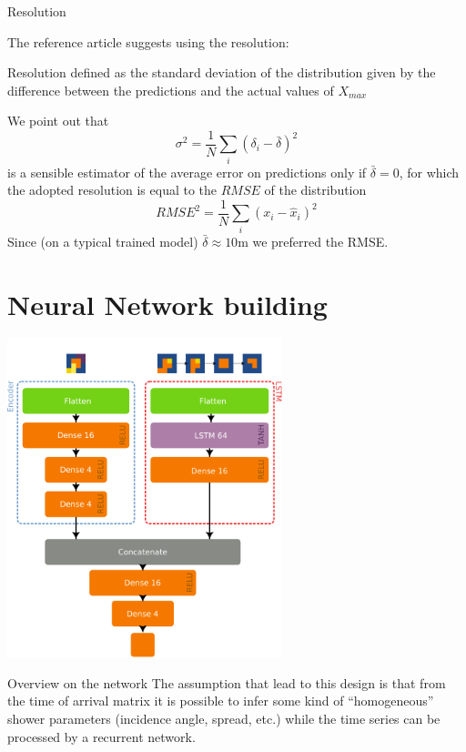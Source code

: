\documentclass{beamer}
\begin{document}
\begin{frame}{Resolution}

    The reference article suggests using the resolution:
    \begin{block}{Resolution}
        defined as the standard deviation of the distribution given by the difference between the predictions and the actual values of $X_{max}$
    \end{block}

    We point out that 
    \[\sigma^2 = \frac{1}{N}\sum_i (\delta_i - \bar{\delta})^2\]
    is a sensible estimator of the average error on predictions only if $\bar{\delta} = 0$, for which the adopted resolution is equal 
    to the $RMSE$ of the distribution
    \[ RMSE^2 = \frac{1}{N}\sum_i(x_i - \hat{x}_i)^2 \]
    Since (on a typical trained model) $\bar{\delta} \approx 10$m we preferred the RMSE.
\end{frame}



\section{Neural Network building}

    \centering
    \includegraphics[width=0.6\textwidth]{figures/model.pdf}
\begin{frame}{Overview on the network}
    The assumption that lead to this design is that from the time of arrival matrix
    it is possible to infer some kind of ``homogeneous'' shower parameters (incidence angle, spread, etc.)
    while the time series can be processed by a recurrent network.
\end{frame}
\end{document}
